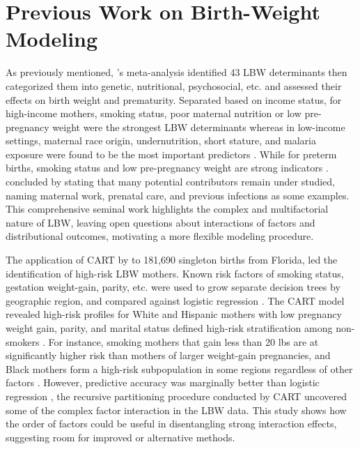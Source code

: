 \section{Previous Work on Birth-Weight Modeling}
\label{sec:ch2-previous-work}

As previously mentioned, \textcite{kramer1987}'s meta-analysis identified 43 LBW determinants then categorized them into genetic, nutritional, psychosocial, etc. and assessed their effects on birth weight and prematurity. Separated based on income status, for high-income mothers, smoking status, poor maternal nutrition or low pre-pregnancy weight were the strongest LBW determinants whereas in low-income settings, maternal race origin, undernutrition, short stature, and malaria exposure were found to be the most important predictors \parencite{kramer1987}. While for preterm births, smoking status and low pre-pregnancy weight are strong indicators \parencite{kramer1987}.  \textcite{kramer1987} concluded by stating that many potential contributors remain under studied, naming maternal work, prenatal care, and previous infections as some examples. This comprehensive seminal work highlights the complex and multifactorial nature of LBW, leaving open questions about interactions of factors and distributional outcomes, motivating a more flexible modeling procedure.

The application of CART by \textcite{KITSANTAS2006275} to 181,690 singleton births from Florida, led the identification of high-risk LBW mothers. Known risk factors of smoking status, gestation weight-gain, parity, etc. were used to grow separate decision trees by geographic region, and compared against logistic regression \parencite{KITSANTAS2006275}. The CART model revealed high-risk profiles for White and Hispanic mothers with low pregnancy weight gain, parity, and marital status defined high-risk stratification among non-smokers \parencite{KITSANTAS2006275}. For instance, smoking mothers that gain less than 20 lbs are at significantly higher risk than mothers of larger weight-gain pregnancies, and Black mothers form a high-risk subpopulation in some regions regardless of other factors \parencite{KITSANTAS2006275}. However, predictive accuracy was marginally better than logistic regression \parencite{KITSANTAS2006275}, the recursive partitioning procedure conducted by CART uncovered some of the complex factor interaction in the LBW data. This study shows how the order of factors could be useful in disentangling strong interaction effects, suggesting room for improved or alternative methods. 

